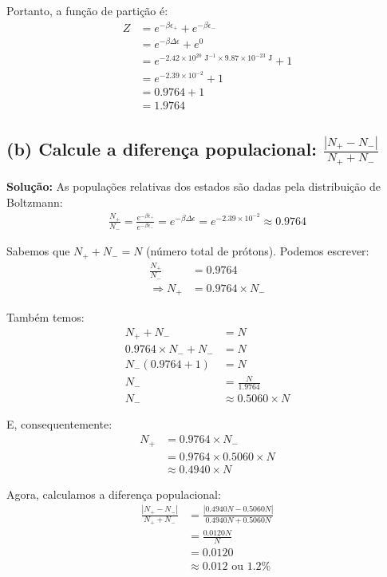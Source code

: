 \documentclass[fleqn,a4paper]{article}
\begin{document}
Portanto, a função de partição é:
\begin{align}
Z &= e^{-\beta \epsilon_+} + e^{-\beta \epsilon_-} \\
&= e^{-\beta \Delta\epsilon} + e^{0} \\
&= e^{-2.42 \times 10^{20} \text{ J}^{-1} \times 9.87 \times 10^{-23} \text{ J}} + 1 \\
&= e^{-2.39 \times 10^{-2}} + 1 \\
&= 0.9764 + 1 \\
&= 1.9764
\end{align}

\subsection*{(b) Calcule a diferença populacional: $\frac{|N_+-N_-|}{N_++N_-}$}

\textbf{Solução:}
As populações relativas dos estados são dadas pela distribuição de Boltzmann:
\begin{align}
\frac{N_+}{N_-} = \frac{e^{-\beta \epsilon_+}}{e^{-\beta \epsilon_-}} = e^{-\beta \Delta\epsilon} = e^{-2.39 \times 10^{-2}} \approx 0.9764
\end{align}

Sabemos que $N_+ + N_- = N$ (número total de prótons). Podemos escrever:
\begin{align}
\frac{N_+}{N_-} &= 0.9764 \\
\Rightarrow N_+ &= 0.9764 \times N_-
\end{align}

Também temos:
\begin{align}
N_+ + N_- &= N \\
0.9764 \times N_- + N_- &= N \\
N_-(0.9764 + 1) &= N \\
N_- &= \frac{N}{1.9764} \\
N_- &\approx 0.5060 \times N
\end{align}

E, consequentemente:
\begin{align}
N_+ &= 0.9764 \times N_- \\
&= 0.9764 \times 0.5060 \times N \\
&\approx 0.4940 \times N
\end{align}

Agora, calculamos a diferença populacional:
\begin{align}
\frac{|N_+ - N_-|}{N_+ + N_-} &= \frac{|0.4940N - 0.5060N|}{0.4940N + 0.5060N} \\
&= \frac{0.0120N}{N} \\
&= 0.0120 \\
&\approx 0.012 \text{ ou } 1.2\%
\end{align}
\end{document}
